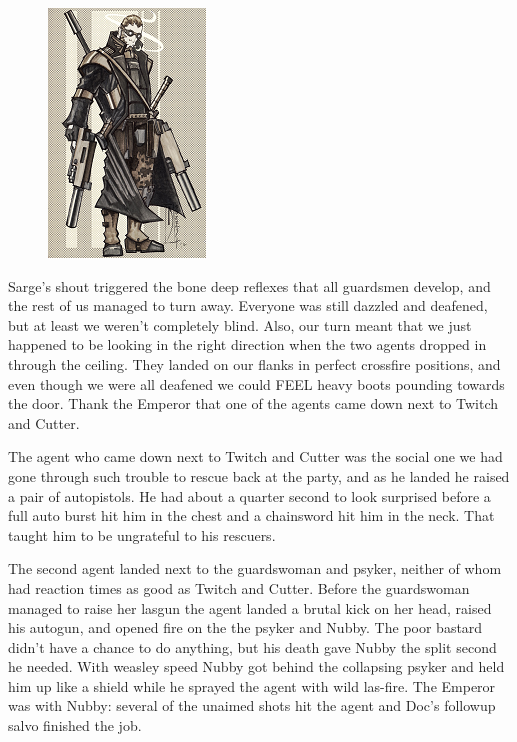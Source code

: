 \begin{figure}
	\begin{center}
		\includegraphics[width=\figwidth]{pics/5/31.png}
	\end{center}
\end{figure}
Sarge’s shout triggered the bone deep reflexes that all guardsmen develop, and the rest of us managed to turn away. 
Everyone was still dazzled and deafened, but at least we weren’t completely blind. 
Also, our turn meant that we just happened to be looking in the right direction when the two agents dropped in through the ceiling. 
They landed on our flanks in perfect crossfire positions, and even though we were all deafened we could FEEL heavy boots pounding towards the door. Thank the Emperor that one of the agents came down next to Twitch and Cutter.

The agent who came down next to Twitch and Cutter was the social one we had gone through such trouble to rescue back at the party, and as he landed he raised a pair of autopistols. 
He had about a quarter second to look surprised before a full auto burst hit him in the chest and a chainsword hit him in the neck. 
That taught him to be ungrateful to his rescuers.

The second agent landed next to the guardswoman and psyker, neither of whom had reaction times as good as Twitch and Cutter. 
Before the guardswoman managed to raise her lasgun the agent landed a brutal kick on her head, raised his autogun, and opened fire on the the psyker and Nubby. 
The poor bastard didn’t have a chance to do anything, but his death gave Nubby the split second he needed. 
With weasley speed Nubby got behind the collapsing psyker and held him up like a shield while he sprayed the agent with wild las-fire. 
The Emperor was with Nubby: 
several of the unaimed shots hit the agent and Doc’s followup salvo finished the job.

